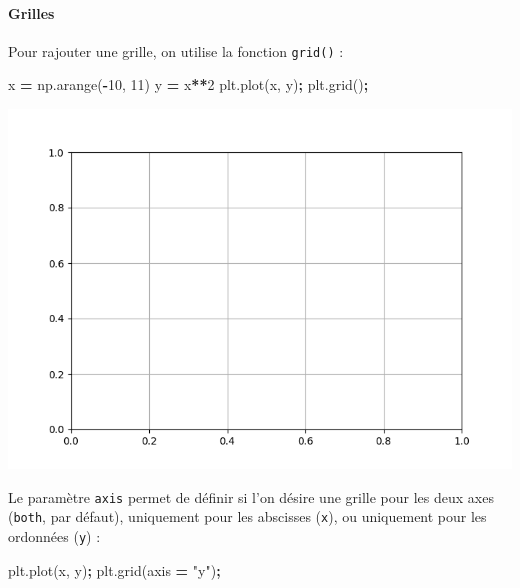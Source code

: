 \documentclass[
  12pt,
]{book}
\newenvironment{Shaded}{\begin{snugshade}}{\end{snugshade}}
\newcommand{\DecValTok}[1]{\textcolor[rgb]{0.00,0.00,0.81}{#1}}
\newcommand{\NormalTok}[1]{#1}
\newcommand{\OperatorTok}[1]{\textcolor[rgb]{0.81,0.36,0.00}{\textbf{#1}}}
\newcommand{\StringTok}[1]{\textcolor[rgb]{0.31,0.60,0.02}{#1}}
\numberwithin{equation}{section}
\numberwithin{countremarque}{section}
\begin{document}
\paragraph{Grilles}\label{grilles}

Pour rajouter une grille, on utilise la fonction \texttt{grid()} :

\begin{Shaded}
\begin{Highlighting}[]
\NormalTok{x }\OperatorTok{=}\NormalTok{ np.arange(}\OperatorTok{{-}}\DecValTok{10}\NormalTok{, }\DecValTok{11}\NormalTok{)}
\NormalTok{y }\OperatorTok{=}\NormalTok{ x}\OperatorTok{**}\DecValTok{2}
\NormalTok{plt.plot(x, y)}\OperatorTok{;}
\NormalTok{plt.grid()}\OperatorTok{;}
\end{Highlighting}
\end{Shaded}

\begin{center}\includegraphics[width=9.03in]{figs/pyplot/plot_grid} \end{center}

Le paramètre \texttt{axis} permet de définir si l'on désire une grille pour les deux axes (\texttt{both}, par défaut), uniquement pour les abscisses (\texttt{x}), ou uniquement pour les ordonnées (\texttt{y}) :

\begin{Shaded}
\begin{Highlighting}[]
\NormalTok{plt.plot(x, y)}\OperatorTok{;}
\NormalTok{plt.grid(axis }\OperatorTok{=} \StringTok{"y"}\NormalTok{)}\OperatorTok{;}
\end{Highlighting}
\end{Shaded}
\end{document}
